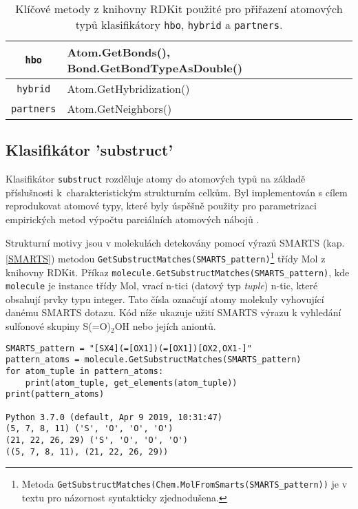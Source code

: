 \begin{table}[h]
\begin{center}
\label{atom_rdkit_methods}
\renewcommand{\arraystretch}{1.3}
    \begin{small}
    \hspace{7mm}\begin{tabular}{c|l}
        \verb|hbo| & Atom.GetBonds(), Bond.GetBondTypeAsDouble() \\
        \hline
        \verb|hybrid| & Atom.GetHybridization() \\
        \hline
        \verb|partners| & Atom.GetNeighbors() \\
    \end{tabular}
    \end{small}
    \caption{Klíčové metody z knihovny RDKit použité pro přiřazení atomových typů klasifikátory \texttt{hbo}, \texttt{hybrid} a \texttt{partners}.}
\end{center}
\end{table}
\subsection{Klasifikátor 'substruct'}
Klasifikátor \verb|substruct| rozděluje atomy do atomových typů na základě příslušnosti k~charakteristickým strukturním celkům. Byl implementován s cílem reprodukovat atomové typy, které byly úspěšně použity pro parametrizaci empirických metod výpočtu parciálních atomových nábojů \cite{attyp1, attyp2}. 

Strukturní motivy jsou v molekulách detekovány pomocí výrazů SMARTS (kap. \ref{SMARTS}) metodou  \verb|GetSubstructMatches(SMARTS_pattern)|\footnote{Metoda  \texttt{GetSubstructMatches(Chem.MolFromSmarts(SMARTS\_pattern))} je v textu pro názornost syntakticky zjednodušena.} třídy Mol z kni\-hovny RDKit. 
Příkaz \verb|molecule.GetSubstructMatches(SMARTS_pattern)|, kde \verb|molecule| je instance třídy Mol, 
vrací n-tici (datový typ \textit{tuple}) n-tic, které  obsahují prvky typu integer. Tato čísla označují atomy molekuly vyhovující danému SMARTS dotazu. 
Kód níže ukazuje užití SMARTS výrazu k vyhledání sulfonové skupiny S(=O)$_2$OH nebo jejích aniontů.


\begin{lstlisting}
SMARTS_pattern = "[SX4](=[OX1])(=[OX1])[OX2,OX1-]"
pattern_atoms = molecule.GetSubstructMatches(SMARTS_pattern)
for atom_tuple in pattern_atoms:
    print(atom_tuple, get_elements(atom_tuple))
print(pattern_atoms)

Python 3.7.0 (default, Apr 9 2019, 10:31:47)
(5, 7, 8, 11) ('S', 'O', 'O', 'O')
(21, 22, 26, 29) ('S', 'O', 'O', 'O')
((5, 7, 8, 11), (21, 22, 26, 29))
\end{lstlisting}

